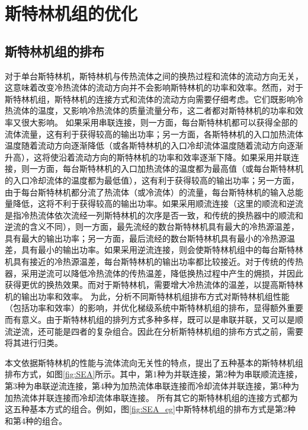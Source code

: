 \chapter{斯特林机组的优化}
\label{cha:optSEA}

\section{斯特林机组的排布}
\label{sec:connectionTypes}
对于单台斯特林机，斯特林机与传热流体之间的换热过程和流体的流动方向无关，这意味着改变冷热流体的流动方向并不会影响斯特林机的功率和效率。然而，对于斯特林机组，斯特林机的连接方式和流体的流动方向需要仔细考虑。它们既影响冷热流体的温度，又影响冷热流体的质量流量分布，这二者都对斯特林机的功率和效率又很大影响。
如果采用串联连接，则一方面，每台斯特林机都可以获得全部的流体流量，这有利于获得较高的输出功率；另一方面，各斯特林机的入口加热流体温度随着流动方向逐渐降低（或各斯特林机的入口冷却流体温度随着流动方向逐渐升高），这将使沿着流动方向的斯特林机的功率和效率逐渐下降。如果采用并联连接，则一方面，每台斯特林机的入口加热流体的温度都为最高值（或每台斯特林机的入口冷却流体的温度都为最低值），这有利于获得较高的输出功率；另一方面，由于每台斯特林机都分流了热流体（或冷流体）的流量，每台斯特林机的输入总能量降低，这将不利于获得较高的输出功率。如果采用顺流连接（这里的顺流和逆流是指冷热流体依次流经一列斯特林机的次序是否一致，和传统的换热器中的顺流和逆流的含义不同），则一方面，最先流经的数台斯特林机具有最大的冷热源温差，具有最大的输出功率；另一方面，最后流经的数台斯特林机具有最小的冷热源温差，具有最小的输出功率。如果采用逆流连接，则会使斯特林机组中的每台斯特林机具有接近的冷热源温差，每台斯特林机的输出功率都比较接近。对于传统的传热器，采用逆流可以降低冷热流体的传热温差，降低换热过程中产生的㶲损，并因此获得更优的换热效果。而对于斯特林机，需要增大冷热流体的温差，以提高斯特林机的输出功率和效率。
为此，分析不同斯特林机组排布方式对斯特林机组性能（包括功率和效率）的影响，并优化梯级系统中斯特林机组的排布，显得额外重要而有意义。由于斯特林机组的排列方式多种多样，既可以是串联并联，又可以是顺流逆流，还可能是四者的复杂组合。因此在分析斯特林机组的排布方式之前，需要将其进行归类。

本文依据斯特林机的性能与流体流向无关性的特点，提出了五种基本的斯特林机组排布方式，如图\ref{fig:SEA}所示。其中，第1种为并联连接，第2种为串联顺流连接，第3种为串联逆流连接，第4种为加热流体串联连接而冷却流体并联连接，第5种为加热流体并联连接而冷却流体串联连接。
所有其它的斯特林机组的连接方式都为这五种基本方式的组合。例如，图\ref{fig:SEA_eg}中斯特林机组的排布方式是第2种和第4种的组合。

